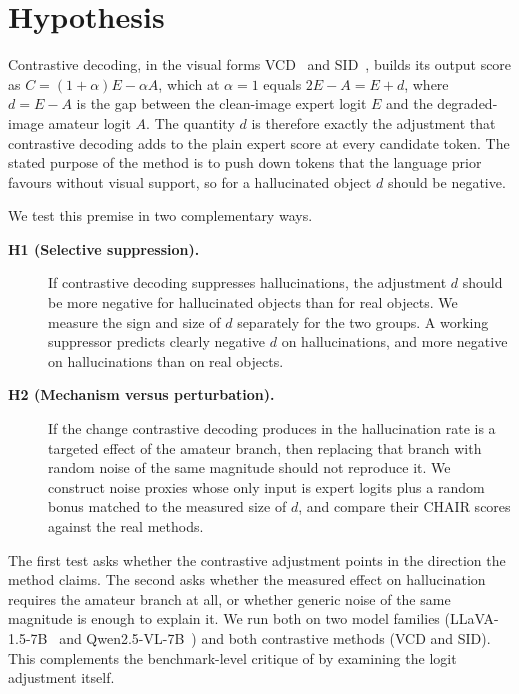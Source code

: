 
\section{Hypothesis}
\label{sec:dproxy-hypothesis}

Contrastive decoding, in the visual forms VCD~\citep{leng2024vcd} and
SID~\citep{huo2024sid}, builds its output score as
$C = (1+\alpha)E - \alpha A$, which at $\alpha = 1$ equals $2E - A = E + d$,
where $d = E - A$ is the gap between the clean-image expert logit $E$ and the
degraded-image amateur logit $A$. The quantity $d$ is therefore exactly the
adjustment that contrastive decoding adds to the plain expert score at every
candidate token. The stated purpose of the method is to push down tokens that
the language prior favours without visual support, so for a hallucinated object
$d$ should be negative.

We test this premise in two complementary ways.

\begin{description}
  \item[\textbf{H1 (Selective suppression).}] If contrastive decoding suppresses
  hallucinations, the adjustment $d$ should be more negative for hallucinated
  objects than for real objects. We measure the sign and size of $d$ separately
  for the two groups. A working suppressor predicts clearly negative $d$ on
  hallucinations, and more negative on hallucinations than on real objects.
  \item[\textbf{H2 (Mechanism versus perturbation).}] If the change contrastive
  decoding produces in the hallucination rate is a targeted effect of the
  amateur branch, then replacing that branch with random noise of the same
  magnitude should not reproduce it. We construct noise proxies whose only input
  is expert logits plus a random bonus matched to the measured size of $d$, and
  compare their CHAIR scores against the real methods.
\end{description}

\noindent The first test asks whether the contrastive adjustment points in the
direction the method claims. The second asks whether the measured effect on
hallucination requires the amateur branch at all, or whether generic noise of
the same magnitude is enough to explain it. We run both on two model families
(LLaVA-1.5-7B~\citep{liu2024llava} and
Qwen2.5-VL-7B~\citep{bai2025qwen25vl}) and both contrastive methods (VCD and
SID). This complements the benchmark-level critique of
\citet{yin2025mirage} by examining the logit adjustment itself.
